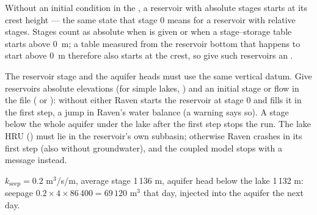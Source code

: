 Without an initial condition in the , a reservoir with absolute stages starts at its crest height --- the same state
that stage 0 means for a reservoir with relative stages. Stages count as absolute when
 is given or when a stage--storage table starts above 0~m; a table measured from the
reservoir bottom that happens to start above 0~m therefore also starts at the crest, so give such reservoirs an
.
\begin{watch}
The reservoir stage and the aquifer heads must use the same vertical datum. Give reservoirs absolute elevations (for
simple lakes, ) and an initial stage or flow in the  file
( or ): without either Raven starts the reservoir at stage 0 and
fills it in the first step, a jump in Raven's water balance (a warning says so). A stage below the whole aquifer under
the lake after the first step stops the run. The lake HRU () must lie in the reservoir's own subbasin;
otherwise Raven crashes in its first step (also without groundwater), and the coupled model stops with a message
instead.
\end{watch}
\begin{example}
$k_{\mathrm{seep}}=0.2$ m$^3$/s/m, average stage 1\,136 m, aquifer head below the lake 1\,132 m: seepage
$0.2\times4\times86\,400=69\,120$ m$^3$ that day, injected into the aquifer the next day.
\end{example}

